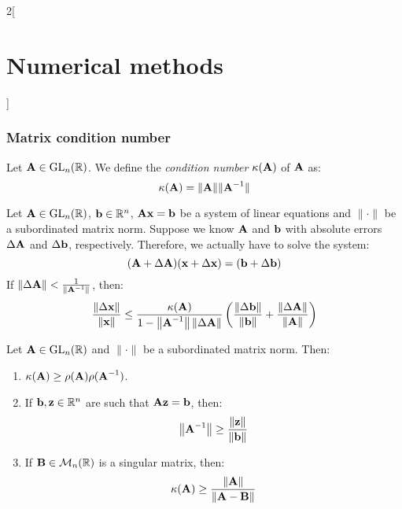 \documentclass[../../../main_math.tex]{subfiles}
\begin{document}
\begin{multicols}{2}[\section{Numerical methods}]
  \subsubsection{Matrix condition number}
  \begin{definition}
    Let $\vf{A}\in\GL_n(\RR)$. We define the \emph{condition number} $\kappa(\vf{A})$ of $\vf{A}$ as: $$\kappa(\vf{A})=\|\vf{A}\|\|\vf{A}^{-1}\|$$
  \end{definition}
  \begin{theorem}
    Let $\vf{A}\in\GL_n(\RR)$, $\vf{b}\in\RR^n$, $\vf{A}\vf{x}=\vf{b}$ be a system of linear equations and $\|\cdot\|$ be a subordinated matrix norm. Suppose we know $\vf{A}$ and $\vf{b}$ with absolute errors $\Delta\vf{A}$ and $\Delta\vf{b}$, respectively. Therefore, we actually have to solve the system: $$(\vf{A}+\Delta\vf{A})(\vf{x}+\Delta \vf{x})=(\vf{b}+\Delta\vf{b})$$ If $\|\Delta\vf{A}\|<\frac{1}{\|\vf{A}^{-1}\|}$, then: $$\frac{\|\Delta \vf{x}\|}{\|\vf{x}\|}\leq\frac{\kappa(\vf{A})}{1-\norm{\vf{A}^{-1}}\norm{\Delta\vf{A}}}\left(\frac{\norm{\Delta\vf{b}}}{\norm{\vf{b}}}+\frac{\norm{\Delta\vf{A}}}{\norm{\vf{A}}}\right)$$
  \end{theorem}
  \begin{theorem}
    Let $\vf{A}\in\GL_n(\RR)$ and $\|\cdot\|$ be a subordinated matrix norm. Then:
    \begin{enumerate}
      \item $\kappa(\vf{A})\geq\rho(\vf{A})\rho(\vf{A}^{-1})$.
      \item If $\vf{b},\vf{z}\in\RR^n$ are such that $\vf{A}\vf{z}=\vf{b}$, then: $$\norm{\vf{A}^{-1}}\geq\frac{\norm{\vf{z}}}{\norm{\vf{b}}}$$
      \item If $\vf{B}\in\mathcal{M}_n(\RR)$ is a singular matrix, then: $$\kappa(\vf{A})\geq\frac{\norm{\vf{A}}}{\norm{\vf{A}-\vf{B}}}$$
    \end{enumerate}
  \end{theorem}

\end{multicols}
\end{document}
